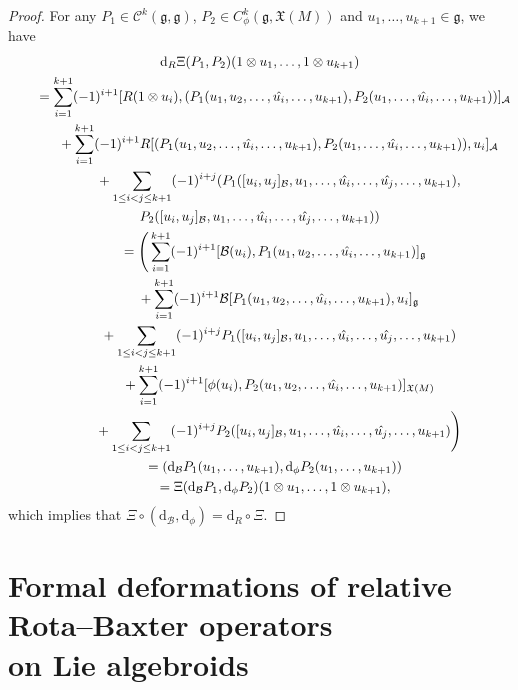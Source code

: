 \documentclass[10pt,a4paper]{amsart}
\numberwithin{equation}{section}
\newcommand{\g}{\mathfrak g}
\newcommand{\huaA}{\mathcal{A}}
\newcommand{\huaB}{\mathcal{B}}
\newcommand{\huaC}{\mathcal{C}}
\newcommand{\dM}{\mathrm{d}}
\begin{document}
\begin{proof}
	For any $P_1\in \huaC^k(\g,\g)$, $P_2\in C_\phi^k(\g,\mathfrak{X}(M))$ and $u_1,\dots,u_{k+1}\in \g$, we have
	\begin{gather*}
\dM_R\Xi(P_1,P_2)(1\otimes u_1,\dots, 1\otimes u_{k+1})
\\ \qquad
{}=\sum_{i=1}^{k+1}(-1)^{i+1} [R(1\otimes u_i),(P_1(u_1,u_2,\dots,\hat{u_i},\dots,u_{k+1}),P_2(u_1,\dots,\hat{u_i},\dots,u_{k+1}))]_{\huaA}
\\ \qquad\hphantom{=}
{}+\sum_{i=1}^{k+1}(-1)^{i+1} R[(P_1(u_1,u_2,\dots,\hat{u_i},\dots,u_{k+1}),P_2(u_1,\dots,\hat{u_i},\dots,u_{k+1})),u_i]_\huaA
\\ \qquad\hphantom{=}
{}+\sum_{1\leq i<j\leq {k+1}}(-1)^{i+j} (P_1([u_i, u_j]_\huaB, u_1,\dots,\hat{u_i},\dots,\hat{u_j},\dots,u_{k+1}),
\\
P_2([u_i,u_j]_\huaB,u_1,\dots,\hat{u_i},\dots,\hat{u_j},\dots,u_{k+1}))
\\ \qquad
{}=\Bigg(\sum_{i=1}^{k+1}(-1)^{i+1}[\huaB(u_i),P_1(u_1,u_2,\dots,\hat{u_i},\dots,u_{k+1})]_{\g}
\\ \qquad\hphantom{=}
{}+\sum_{i=1}^{k+1}(-1)^{i+1}\huaB[P_1(u_1,u_2,\dots,\hat{u_i},\dots,u_{k+1}),u_i]_\g
\\ \qquad\hphantom{=}
{}+\sum_{1\leq i<j\leq {k+1}}(-1)^{i+j}P_1([u_i, u_j]_\huaB,u_1,\dots,\hat{u_i},\dots,\hat{u_j},\dots,u_{k+1})
\\ \qquad\hphantom{=}	
{}+\sum_{i=1}^{k+1}(-1)^{i+1}[\phi(u_i),P_2(u_1,u_2,\dots,\hat{u_i},\dots,u_{k+1})]_{\mathfrak{X}(M)}
\\ \qquad\hphantom{=}
{}+\sum_{1\leq i<j\leq {k+1}}(-1)^{i+j}P_2([u_i, u_j]_\huaB,u_1,\dots,\hat{u_i},\dots,\hat{u_j},\dots,u_{k+1})\Bigg)
\\ \qquad
{}= (\dM_\huaB P_1	(u_1,\dots, u_{k+1}),\dM_\phi P_2	( u_1,\dots, u_{k+1}))
\\ \qquad	
{}=\Xi(\dM_\huaB P_1,\dM_\phi P_2)	(1\otimes u_1,\dots, 1\otimes u_{k+1}),
\end{gather*}
which implies that 	$\Xi\circ(\dM_\huaB,\dM_\phi)=\dM_R\circ \Xi$.
\end{proof}

\section[Formal deformations of relative Rota--Baxter operators on Lie algebroids]{Formal deformations of relative Rota--Baxter operators\\ on Lie algebroids}\label{sec:Cohomology-RRB-operator}
\end{document}
